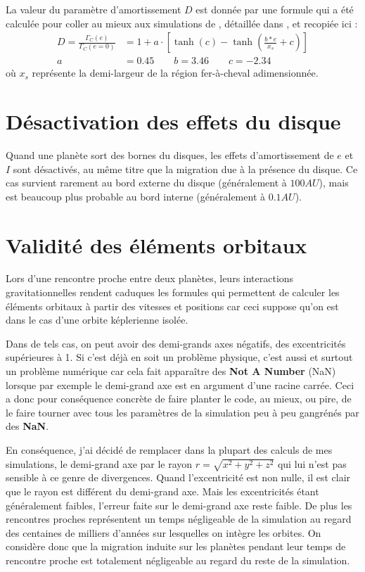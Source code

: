 La valeur du paramètre d'amortissement $D$ est donnée par une formule qui a été calculée pour coller au mieux aux simulations de \cite{bitsch2010orbital}, détaillée dans \cite{cossou2013convergence}, et recopiée ici : 
\begin{subequations}
\begin{align}
D = \frac{\Gamma_C(e)}{\Gamma_C (e=0)} &= 1 + a \cdot \left[\tanh(c) - \tanh\left(\frac{b * e}{x_s}+c\right)\right]\label{eq:eccentricity-influence}\\
a &= 0.45 \qquad b=3.46 \qquad c= -2.34
\end{align}
\end{subequations}
où $x_s$ représente la demi-largeur de la région fer-à-cheval adimensionnée.

\section{Désactivation des effets du disque}
Quand une planète sort des bornes du disques, les effets d'amortissement de $e$ et $I$ sont désactivés, au même titre que la migration due à la présence du disque. Ce cas survient rarement au bord externe du disque (généralement à $100\unit{AU}$), mais est beaucoup plus probable au bord interne (généralement à $0.1\unit{AU}$).

\section{Validité des éléments orbitaux}
Lors d'une rencontre proche entre deux planètes, leurs interactions gravitationnelles rendent caduques les formules qui permettent de calculer les éléments orbitaux à partir des vitesses et positions car ceci suppose qu'on est dans le cas d'une orbite képlerienne isolée. 

Dans de tels cas, on peut avoir des demi-grands axes négatifs, des excentricités supérieures à 1. Si c'est déjà en soit un problème physique, c'est aussi et surtout un problème numérique car cela fait apparaître des \textbf{Not A Number} (NaN) lorsque par exemple le demi-grand axe est en argument d'une racine carrée. Ceci a donc pour conséquence concrète de faire planter le code, au mieux, ou pire, de le faire tourner avec tous les paramètres de la simulation peu à peu gangrénés par des \textbf{NaN}. 

En conséquence, j'ai décidé de remplacer dans la plupart des calculs de mes simulations, le demi-grand axe par le rayon $r=\sqrt{x^2+y^2+z^2}$ qui lui n'est pas sensible à ce genre de divergences. Quand l'excentricité est non nulle, il est clair que le rayon est différent du demi-grand axe. Mais les excentricités étant généralement faibles, l'erreur faite sur le demi-grand axe reste faible. De plus les rencontres proches représentent un temps négligeable de la simulation au regard des centaines de milliers d'années sur lesquelles on intègre les orbites. On considère donc que la migration induite sur les planètes pendant leur temps de rencontre proche est totalement négligeable au regard du reste de la simulation.



